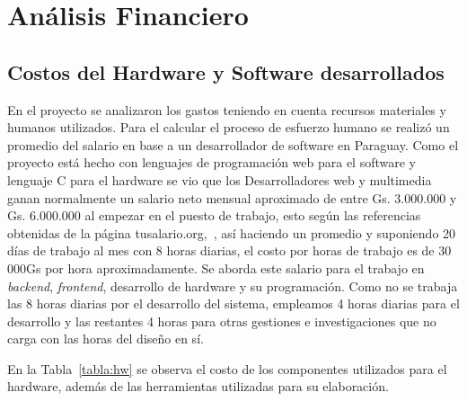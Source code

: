 \section[Análisis Financiero]{Análisis Financiero}

\subsection{Costos del Hardware y Software desarrollados}
En el proyecto se analizaron los gastos teniendo en cuenta  recursos materiales y humanos utilizados. 
Para el calcular el proceso de esfuerzo humano se realizó un promedio del salario en base a un desarrollador de software en Paraguay. 
Como el proyecto está hecho con lenguajes de programación web para el software y lenguaje C para el hardware se vio que los Desarrolladores web y multimedia ganan normalmente un salario neto mensual aproximado de entre Gs. 3.000.000 y Gs. 6.000.000 al empezar en el puesto de trabajo, esto según las referencias obtenidas de la página tusalario.org,~\cite{tusalario}, así haciendo un promedio y suponiendo 20 días de trabajo al mes con 8 horas diarias, el costo por horas de trabajo es de 30 000Gs por hora aproximadamente. 
Se aborda este salario para el trabajo en \textit{backend}, \textit{frontend}, desarrollo de hardware y su programación. 
Como no se trabaja las 8 horas diarias por el desarrollo del sistema, empleamos 4 horas diarias para el desarrollo y las restantes 4 horas para otras gestiones e investigaciones que no carga con las horas del diseño en sí. 

En la Tabla~\ref{tabla:hw} se observa el costo de los componentes utilizados para el hardware, además de las herramientas utilizadas para su elaboración. 


